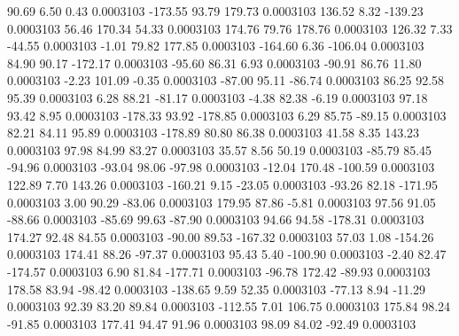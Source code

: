        90.69        6.50        0.43     0.0003103
     -173.55       93.79      179.73     0.0003103
      136.52        8.32     -139.23     0.0003103
       56.46      170.34       54.33     0.0003103
      174.76       79.76      178.76     0.0003103
      126.32        7.33      -44.55     0.0003103
       -1.01       79.82      177.85     0.0003103
     -164.60        6.36     -106.04     0.0003103
       84.90       90.17     -172.17     0.0003103
      -95.60       86.31        6.93     0.0003103
      -90.91       86.76       11.80     0.0003103
       -2.23      101.09       -0.35     0.0003103
      -87.00       95.11      -86.74     0.0003103
       86.25       92.58       95.39     0.0003103
        6.28       88.21      -81.17     0.0003103
       -4.38       82.38       -6.19     0.0003103
       97.18       93.42        8.95     0.0003103
     -178.33       93.92     -178.85     0.0003103
        6.29       85.75      -89.15     0.0003103
       82.21       84.11       95.89     0.0003103
     -178.89       80.80       86.38     0.0003103
       41.58        8.35      143.23     0.0003103
       97.98       84.99       83.27     0.0003103
       35.57        8.56       50.19     0.0003103
      -85.79       85.45      -94.96     0.0003103
      -93.04       98.06      -97.98     0.0003103
      -12.04      170.48     -100.59     0.0003103
      122.89        7.70      143.26     0.0003103
     -160.21        9.15      -23.05     0.0003103
      -93.26       82.18     -171.95     0.0003103
        3.00       90.29      -83.06     0.0003103
      179.95       87.86       -5.81     0.0003103
       97.56       91.05      -88.66     0.0003103
      -85.69       99.63      -87.90     0.0003103
       94.66       94.58     -178.31     0.0003103
      174.27       92.48       84.55     0.0003103
      -90.00       89.53     -167.32     0.0003103
       57.03        1.08     -154.26     0.0003103
      174.41       88.26      -97.37     0.0003103
       95.43        5.40     -100.90     0.0003103
       -2.40       82.47     -174.57     0.0003103
        6.90       81.84     -177.71     0.0003103
      -96.78      172.42      -89.93     0.0003103
      178.58       83.94      -98.42     0.0003103
     -138.65        9.59       52.35     0.0003103
      -77.13        8.94      -11.29     0.0003103
       92.39       83.20       89.84     0.0003103
     -112.55        7.01      106.75     0.0003103
      175.84       98.24      -91.85     0.0003103
      177.41       94.47       91.96     0.0003103
       98.09       84.02      -92.49     0.0003103
